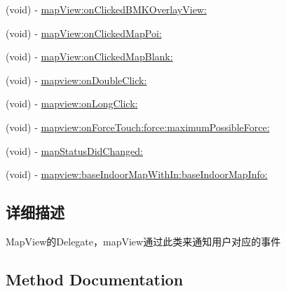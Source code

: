 \begin{DoxyCompactItemize}
\item 
(void) -\/ \hyperlink{protocol_b_m_k_map_view_delegate-p_a92829c083dcbd0b60209abb023b109fe}{map\+View\+:on\+Clicked\+B\+M\+K\+Overlay\+View\+:}
\item 
(void) -\/ \hyperlink{protocol_b_m_k_map_view_delegate-p_ac3e98436fce2ee14c02837200e57a6fe}{map\+View\+:on\+Clicked\+Map\+Poi\+:}
\item 
(void) -\/ \hyperlink{protocol_b_m_k_map_view_delegate-p_a7e98b75f0edfc05ed93fda98f3fb682e}{map\+View\+:on\+Clicked\+Map\+Blank\+:}
\item 
(void) -\/ \hyperlink{protocol_b_m_k_map_view_delegate-p_a957fb04d2fb88bd0e45ad9d712c1e85f}{mapview\+:on\+Double\+Click\+:}
\item 
(void) -\/ \hyperlink{protocol_b_m_k_map_view_delegate-p_abdef3e78c6a4d51665bc859e16c629a4}{mapview\+:on\+Long\+Click\+:}
\item 
(void) -\/ \hyperlink{protocol_b_m_k_map_view_delegate-p_a1715deab8f5cc59b50c05d222712f163}{mapview\+:on\+Force\+Touch\+:force\+:maximum\+Possible\+Force\+:}
\item 
(void) -\/ \hyperlink{protocol_b_m_k_map_view_delegate-p_a06d810eed5ca8add043ab4cd9367f14f}{map\+Status\+Did\+Changed\+:}
\item 
(void) -\/ \hyperlink{protocol_b_m_k_map_view_delegate-p_a9f922d89f1bd54dcc17f4951ccc62fad}{mapview\+:base\+Indoor\+Map\+With\+In\+:base\+Indoor\+Map\+Info\+:}
\end{DoxyCompactItemize}


\subsection{详细描述}
Map\+View的\+Delegate，map\+View通过此类来通知用户对应的事件 

\subsection{Method Documentation}
\hypertarget{protocol_b_m_k_map_view_delegate-p_a06d810eed5ca8add043ab4cd9367f14f}{}
